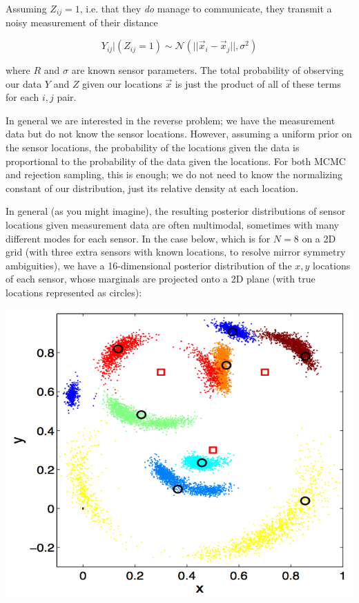 \documentclass{article}
\begin{document}
Assuming $Z_{ij} = 1$, i.e. that they \textit{do} manage to communicate, they
transmit a noisy measurement of their distance

$$ Y_{ij}|(Z_{ij} = 1) \sim \mathcal{N}\left(||\vec{x}_i - \vec{x}_j||,
\sigma^2\right) $$

where $R$ and $\sigma$ are known sensor parameters. The total
probability of observing our data $Y$ and $Z$ given our locations
$\vec{x}$ is just the product of all of these terms for each $i, j$
pair.

In general we are interested in the reverse problem; we have the measurement
data but do not know the sensor locations. However, assuming a uniform prior on
the sensor locations, the probability of the locations given the data is
proportional to the probability of the data given the locations. For both MCMC
and rejection sampling, this is enough; we do not need to know the normalizing
constant of our distribution, just its relative density at each location.

In general (as you might imagine), the resulting posterior distributions of
sensor locations given measurement data are often multimodal, sometimes with
many different modes for each sensor. In the case below, which is for $N=8$
on a 2D grid (with three extra sensors with known locations, to resolve mirror
symmetry ambiguities), we have a 16-dimensional posterior distribution of the
$x,y$ locations of each sensor, whose marginals are projected onto a 2D
plane (with true locations represented as circles):

\includegraphics[width=\textwidth]{noisysensor.png}
\end{document}
